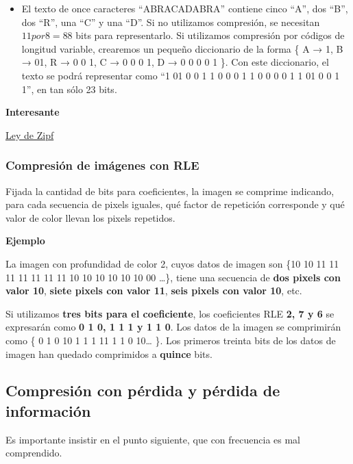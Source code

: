 \documentclass[spanish,A4,]{article}
\begin{document}
\begin{itemize}
\itemsep1pt\parskip0pt
\item
  El texto de once caracteres ``ABRACADABRA'' contiene cinco ``A'', dos
  ``B'', dos ``R'', una ``C'' y una ``D''. Si no utilizamos compresión,
  se necesitan $11  por  8 = 88$ bits para representarlo. Si utilizamos
  compresión por códigos de longitud variable, crearemos un pequeño
  diccionario de la forma \{ A → 1, B → 01, R → 0 0 1, C → 0 0 0 1, D → 0 0 0 0 1
  \}. Con este diccionario, el texto se podrá representar como ``1 01
  0 0 1 1 0 0 0 1 1 0 0 0 0 1 1 01 0 0 1 1'', en tan sólo 23 bits.
\end{itemize}

\textbf{Interesante}

\href{https://es.m.wikipedia.org/wiki/Ley sub de sub Zipf}{Ley de Zipf}

\subsubsection{Compresión de imágenes con
RLE}\label{compresiuxf3n-de-imuxe1genes-con-rle}

Fijada la cantidad de bits para coeficientes, la imagen se comprime
indicando, para cada secuencia de pixels iguales, qué factor de
repetición corresponde y qué valor de color llevan los pixels repetidos.

\textbf{Ejemplo}

La imagen con profundidad de color 2, cuyos datos de imagen son \{10 10
11 11 11 11 11 11 11 10 10 10 10 10 10 00 \ldots{}\}, tiene una
secuencia de \textbf{dos pixels con valor 10}, \textbf{siete pixels con
valor 11}, \textbf{seis pixels con valor 10}, etc.

Si utilizamos \textbf{tres bits para el coeficiente}, los coeficientes
RLE \textbf{2, 7 y 6} se expresarán como \textbf{0 1 0, 1 1 1 y 1 1 0}. Los
datos de la imagen se comprimirán como \{ 0 1 0 10 1 1 1 11 1 1 0 10\ldots{}
\}. Los primeros treinta bits de los datos de imagen han quedado
comprimidos a \textbf{quince} bits.

\subsection{Compresión con pérdida y pérdida de
información}\label{compresiuxf3n-con-puxe9rdida-y-puxe9rdida-de-informaciuxf3n}

Es importante insistir en el punto siguiente, que con frecuencia es mal
comprendido.
\end{document}
